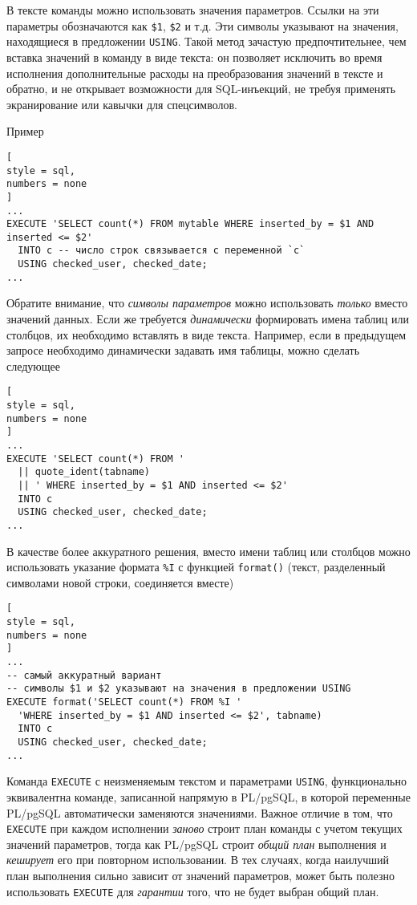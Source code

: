 \documentclass[%
	11pt,
	a4paper,
	utf8,
		]{article}
\begin{document}
В тексте команды можно использовать значения параметров. Ссылки на эти параметры обозначаются как \texttt{\$1}, \texttt{\$2} и т.д. Эти символы указывают на значения, находящиеся в предложении \texttt{USING}. Такой метод зачастую предпочтительнее, чем вставка значений в команду в виде текста: он позволяет исключить во время исполнения дополнительные расходы на преобразования значений в тексте и обратно, и не открывает возможности для SQL-инъекций, не требуя применять экранирование или кавычки для спецсимволов.

Пример
\begin{lstlisting}[
style = sql,
numbers = none
]
...
EXECUTE 'SELECT count(*) FROM mytable WHERE inserted_by = $1 AND inserted <= $2'
  INTO c -- число строк связывается с переменной `c`
  USING checked_user, checked_date;
...
\end{lstlisting}

Обратите внимание, что \emph{символы параметров} можно использовать \emph{только} вместо значений данных. Если же требуется \emph{динамически} формировать имена таблиц или столбцов, их необходимо вставлять в виде текста. Например, если в предыдущем запросе необходимо динамически задавать имя таблицы, можно сделать следующее
\begin{lstlisting}[
style = sql,
numbers = none
]
...
EXECUTE 'SELECT count(*) FROM '
  || quote_ident(tabname)
  || ' WHERE inserted_by = $1 AND inserted <= $2'
  INTO c
  USING checked_user, checked_date;
...
\end{lstlisting}

В качестве более аккуратного решения, вместо имени таблиц или столбцов можно использовать указание формата \verb|%I| с функцией \texttt{format()} (текст, разделенный символами новой строки, соединяется вместе)
\begin{lstlisting}[
style = sql,
numbers = none
]
...
-- самый аккуратный вариант
-- символы $1 и $2 указывают на значения в предложении USING
EXECUTE format('SELECT count(*) FROM %I '
  'WHERE inserted_by = $1 AND inserted <= $2', tabname)
  INTO c
  USING checked_user, checked_date;
...
\end{lstlisting}


Команда \texttt{EXECUTE} с неизменяемым текстом и параметрами \texttt{USING}, функционально эквивалентна команде, записанной напрямую в PL/pgSQL, в которой переменные PL/pgSQL автоматически заменяются значениями. Важное отличие в том, что \texttt{EXECUTE} при каждом исполнении \emph{заново} строит план команды с учетом текущих значений параметров, тогда как PL/pgSQL строит \emph{общий план} выполнения и \emph{кеширует} его при повторном использовании. В тех случаях, когда наилучший план выполнения сильно зависит от значений параметров, может быть полезно использовать \texttt{EXECUTE} для \emph{гарантии} того, что не будет выбран общий план.
\end{document}
